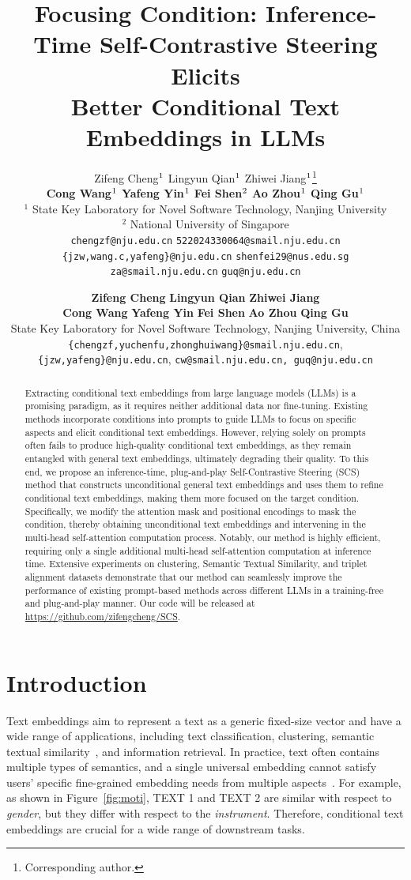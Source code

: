 \documentclass[11pt]{article}
\title{Focusing Condition: Inference-Time Self-Contrastive Steering Elicits\\ Better Conditional Text Embeddings in LLMs}
\author{
Zifeng Cheng$^\text{\textnormal{1}}$ \quad \quad
Lingyun Qian$^\text{\textnormal{1}}$ \quad \quad
Zhiwei Jiang$^\text{\textnormal{1}}$\thanks{Corresponding author.} \quad \quad \\
\textbf{
Cong Wang$^\text{\textnormal{1}}$ \quad \quad
Yafeng Yin$^\text{\textnormal{1}}$ \quad \quad
Fei Shen$^\text{\textnormal{2}}$ \quad \quad 
Ao Zhou$^\text{\textnormal{1}}$ \quad \quad
Qing Gu$^\text{\textnormal{1}}$
} \\
$^\text{1}$ State Key Laboratory for Novel Software Technology, Nanjing University \\
$^\text{2}$ National University of Singapore
\\
\texttt{chengzf@nju.edu.cn} \quad 
\texttt{522024330064@smail.nju.edu.cn} \quad \\
\texttt{\{jzw,wang.c,yafeng\}@nju.edu.cn} \quad
\texttt{shenfei29@nus.edu.sg} \\
\texttt{za@smail.nju.edu.cn} \quad 
\texttt{guq@nju.edu.cn}
}
\author{%
\textbf{Zifeng Cheng} \quad \textbf{Lingyun Qian} \quad  \textbf{Zhiwei Jiang}\footnotemark[1] \\
\textbf{Cong Wang} \quad \textbf{Yafeng Yin} \quad  \textbf{Fei Shen} \quad \textbf{Ao Zhou} \quad \textbf{Qing Gu}\\
State Key Laboratory for Novel Software Technology, Nanjing University, China \\
\texttt{\{chengzf,yuchenfu,zhonghuiwang\}@smail.nju.edu.cn}, \\
\texttt{\{jzw,yafeng\}@nju.edu.cn}, \texttt{cw@smail.nju.edu.cn, guq@nju.edu.cn} 
}
\begin{document}
\maketitle
\begin{abstract}
Extracting conditional text embeddings from large language models (LLMs) is a promising paradigm, as it requires neither additional data nor fine-tuning.
Existing methods incorporate conditions into prompts to guide LLMs to focus on specific aspects and elicit conditional text embeddings.
However, relying solely on prompts often fails to produce high-quality conditional text embeddings, as they remain entangled with general text embeddings, ultimately degrading their quality.
To this end, we propose an inference-time, plug-and-play Self-Contrastive Steering (SCS) method that constructs unconditional general text embeddings and uses them to refine conditional text embeddings, making them more focused on the target condition.
Specifically, we modify the attention mask and positional encodings to mask the condition, thereby obtaining unconditional text embeddings and intervening in the multi-head self-attention computation process.
Notably, our method is highly efficient, requiring only a single additional multi-head self-attention computation at inference time.
Extensive experiments on clustering, Semantic Textual Similarity, and triplet alignment datasets demonstrate that our method can seamlessly improve the performance of existing prompt-based methods across different LLMs in a training-free and plug-and-play manner.
Our code will be released at \url{https://github.com/zifengcheng/SCS}.
\end{abstract}


\section{Introduction}
Text embeddings aim to represent a text as a generic fixed-size vector and have a wide range of applications, including text classification, clustering, semantic textual similarity~\cite{sts12,sts13}, and information retrieval.
In practice, text often contains multiple types of semantics, and a single universal embedding cannot satisfy users' specific fine-grained embedding needs from multiple aspects~\cite{csts,DBLP:conf/emnlp/WangSZ23}.
For example, as shown in Figure~\ref{fig:moti}, TEXT 1 and TEXT 2 are similar with respect to \textit{gender}, but they differ with respect to the \textit{instrument}.
Therefore, conditional text embeddings are crucial for a wide range of downstream tasks.
\end{document}
